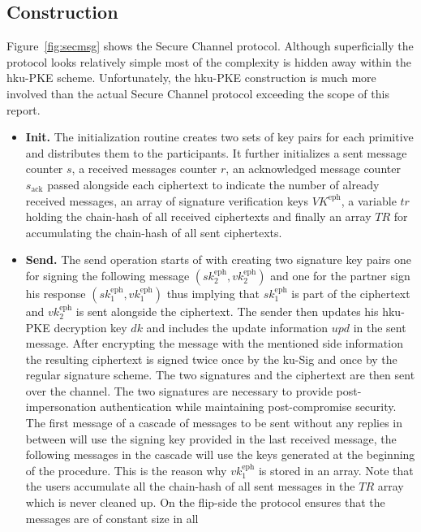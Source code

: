 \documentclass[11pt,a4paper,twoside,openright,bibliography=totoc]{scrbook}
\renewcommand{\t}{\text} %
\begin{document}
\subsection{Construction}
\label{sec:construction-3}

Figure~\ref{fig:secmsg} shows the Secure Channel protocol.
Although superficially the protocol looks relatively simple most of the
complexity is hidden away within the hku-PKE scheme. Unfortunately, the hku-PKE
construction is much more involved than the actual Secure Channel protocol
exceeding the scope of this report.
\begin{itemize}
\item \textbf{Init.} The initialization routine creates two sets of key pairs
  for each primitive and distributes them to the participants. It further
  initializes a sent message counter $s$, a received messages counter $r$,
  an acknowledged message counter $s_\t{ack}$ passed alongside
  each ciphertext to indicate the number of already received messages, an array
  of signature verification keys $VK^\t{eph}$, a variable $tr$ holding the chain-hash
  of all received ciphertexts and finally an array $TR$ for accumulating
  the chain-hash of all sent ciphertexts.
\item \textbf{Send.} The send operation starts of with creating two signature
  key pairs one for signing the following message $(sk_2^\t{eph},vk_2^\t{eph})$
  and one for the partner sign his response $(sk_1^\t{eph},vk_1^\t{eph})$ thus
  implying that $sk_1^\t{eph}$ is part of the ciphertext and $vk_2^\t{eph}$ is
  sent alongside the ciphertext. The sender then updates his
  hku-PKE decryption key $dk$ and includes the update information $upd$
  in the sent message. After encrypting the message with the mentioned
  side information the resulting ciphertext is signed twice once
  by the ku-Sig and once by the regular signature scheme. The two signatures
  and the ciphertext are then sent over the channel. The two signatures are
  necessary to provide post-impersonation authentication while
  maintaining post-compromise
  security. The first message of a cascade of messages to be sent
  without any replies in between will use the signing key provided in
  the last received message, the following messages in the cascade
  will use the keys generated at the beginning of the procedure. This
  is the reason why $vk_1^\t{eph}$ is stored in an array.
  Note that the users accumulate all the chain-hash of all sent
  messages in the $TR$ array which is never cleaned up. On the flip-side
  the protocol ensures that the messages are of constant size in all

\end{itemize}
\end{document}
